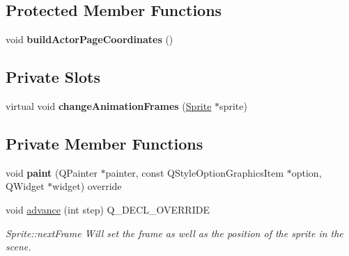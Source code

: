 \subsection*{Protected Member Functions}
\begin{DoxyCompactItemize}
\item 
\mbox{\label{class_actor_a8b92acf4b839678301491ca5ecd7580d}} 
void {\bfseries build\+Actor\+Page\+Coordinates} ()
\end{DoxyCompactItemize}
\subsection*{Private Slots}
\begin{DoxyCompactItemize}
\item 
\mbox{\label{class_actor_ab2820addeaf0b6b2949c2421cc228038}} 
virtual void {\bfseries change\+Animation\+Frames} (\hyperlink{class_sprite}{Sprite} $\ast$sprite)
\end{DoxyCompactItemize}
\subsection*{Private Member Functions}
\begin{DoxyCompactItemize}
\item 
\mbox{\label{class_actor_a4265436c1b899cd3d78dab0e0b255579}} 
void {\bfseries paint} (Q\+Painter $\ast$painter, const Q\+Style\+Option\+Graphics\+Item $\ast$option, Q\+Widget $\ast$widget) override
\item 
\mbox{\label{class_actor_a4aa7f044ffb6dfa5f8ebf243243ee462}} 
void \hyperlink{class_actor_a4aa7f044ffb6dfa5f8ebf243243ee462}{advance} (int step) Q\+\_\+\+D\+E\+C\+L\+\_\+\+O\+V\+E\+R\+R\+I\+DE
\begin{DoxyCompactList}\small\item\em Sprite\+::next\+Frame Will set the frame as well as the position of the sprite in the scene. \end{DoxyCompactList}\end{DoxyCompactItemize}

